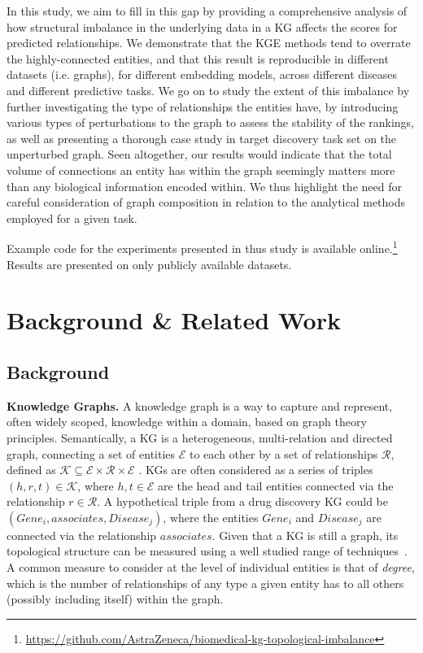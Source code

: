 In this study, we aim to fill in this gap by providing a comprehensive analysis of how structural imbalance in the underlying data in a KG affects the scores for predicted relationships. We demonstrate that the KGE methods tend to overrate the highly-connected entities, and that this result is reproducible in different datasets (i.e. graphs), for different embedding models, across different diseases and different predictive tasks. We go on to study the extent of this imbalance by further investigating the type of relationships the entities have, by introducing various types of perturbations to the graph to assess the stability of the rankings, as well as presenting a thorough case study in target discovery task set on the unperturbed graph. Seen altogether, our results would indicate that the total volume of connections an entity has within the graph seemingly matters more than any biological information encoded within. We thus highlight the need for careful consideration of graph composition in relation to the analytical methods employed for a given task.

Example code for the experiments presented in thus study is available online.\footnote{\url{https://github.com/AstraZeneca/biomedical-kg-topological-imbalance}} Results are presented on only publicly available datasets.\section{Background \& Related Work}\label{sec:litreview}

\subsection{Background}\label{ssec:background}

\textbf{Knowledge Graphs.} A knowledge graph is a way to capture and represent, often widely scoped, knowledge within a domain, based on graph theory principles. Semantically, a KG is a heterogeneous, multi-relation and directed graph, connecting a set of entities \(\mathcal{E}\) to each other by a set of relationships \(\mathcal{R}\), defined as \(\mathcal{K} \subseteq \mathcal{E} \times \mathcal{R} \times \mathcal{E}\) \cite{zhang2019heterogeneous}. KGs are often considered as a series of triples \((h,r,t) \in \mathcal{K}\), where \( h,t \in \mathcal{E}\) are the head and tail entities connected via the relationship \( r \in \mathcal{R}\). A hypothetical triple from a drug discovery KG could be \(( \mathit{Gene}_i, \mathit{associates}, \mathit{Disease}_j) \), where the entities \(\mathit{Gene}_i\) and \(\mathit{Disease}_j\) are connected via the relationship \(\mathit{associates}\). Given that a KG is still a graph, its topological structure can be measured using a well studied range of techniques~\cite{newman2018networks}. A common measure to consider at the level of individual entities is that of \emph{degree}, which is the number of relationships of any type a given entity has to all others (possibly including itself) within the graph.

